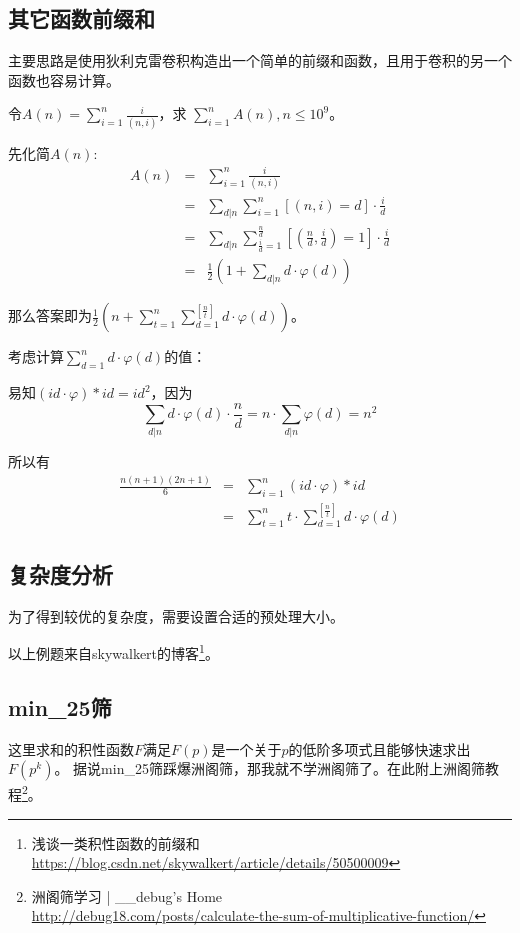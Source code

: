 \subsection{其它函数前缀和}
主要思路是使用狄利克雷卷积构造出一个简单的前缀和函数，且用于卷积的另一个函数也容易计算。

令$\displaystyle A(n)=\sum_{i=1}^n\frac{i}{(n,i)}$，求
$\displaystyle \sum_{i=1}^n{A(n)},n\leq 10^{9}$。

先化简$A(n)$:
\begin{eqnarray*}
    A(n)&=&\sum_{i=1}^n\frac{i}{(n,i)}\\
    &=&\sum_{d|n}{\sum_{i=1}^n{[(n,i)=d]\cdot\frac{i}{d}}}\\
    &=&\sum_{d|n}{\sum_{\frac{i}{d}=1}^{\frac{n}{d}}
    {[(\frac{n}{d},\frac{i}{d})=1]\cdot\frac{i}{d}}}\\
    &=&\frac{1}{2}\left(1+\sum_{d|n}{d\cdot\varphi(d)}\right)
\end{eqnarray*}

那么答案即为$\displaystyle \frac{1}{2}\left(n+\sum_{t=1}^n
    {\sum_{d=1}^{[\frac{n}{t}]}{d\cdot\varphi(d)}}\right)$。

考虑计算$\displaystyle \sum_{d=1}^n{d\cdot\varphi(d)}$的值：

易知$(id\cdot\varphi)*id=id^2$，因为\begin{displaymath}
    \sum_{d|n}d\cdot\varphi(d)\cdot\frac{n}{d}=
    n\cdot\sum_{d|n}\varphi(d)=n^2
\end{displaymath}

所以有\begin{eqnarray*}
    \frac{n(n+1)(2n+1)}{6}&=&\sum_{i=1}^n{(id\cdot\varphi)*id}\\
    &=&\sum_{t=1}^n{t\cdot\sum_{d=1}^{[\frac{n}{t}]}{d\cdot\varphi(d)}}
\end{eqnarray*}

\subsection{复杂度分析}
为了得到较优的复杂度，需要设置合适的预处理大小。

以上例题来自skywalkert的博客\footnote{浅谈一类积性函数的前缀和\\
    \url{https://blog.csdn.net/skywalkert/article/details/50500009}}。

\subsection{min\_25筛}
这里求和的积性函数$F$满足$F(p)$是一个关于$p$的低阶多项式且能够快速求出$F(p^k)$。
据说min\_25筛踩爆洲阁筛，那我就不学洲阁筛了。在此附上洲阁筛教程\footnote{
    洲阁筛学习 | \_\_debug's Home\\
    \url{http://debug18.com/posts/calculate-the-sum-of-multiplicative-function/}
}。

